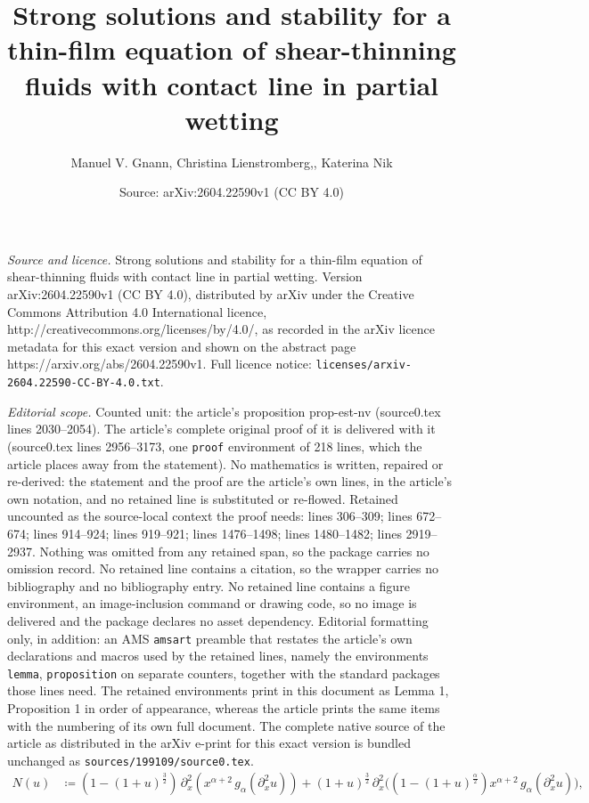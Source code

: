 \documentclass[10pt,a4paper]{amsart}
\title{Strong solutions and stability for a thin-film equation of shear-thinning fluids with contact line in partial wetting}
\author{Manuel V. Gnann, Christina Lienstromberg,, Katerina Nik}
\date{Source: arXiv:2604.22590v1 (CC BY 4.0)}
\begin{document}
\maketitle

\noindent\emph{Source and licence.} Strong solutions and stability for a thin-film equation of shear-thinning fluids with contact line in partial wetting. Version arXiv:2604.22590v1 (CC BY 4.0), distributed by arXiv under the Creative Commons Attribution 4.0 International licence, http://creativecommons.org/licenses/by/4.0/, as recorded in the arXiv licence metadata for this exact version and shown on the abstract page https://arxiv.org/abs/2604.22590v1. Full licence notice: \texttt{licenses/arxiv-2604.22590-CC-BY-4.0.txt}.\par\smallskip

\noindent\textit{Editorial scope.} Counted unit: the article's proposition prop-est-nv (source0.tex lines 2030--2054). The article's complete original proof of it is delivered with it (source0.tex lines 2956--3173, one \texttt{proof} environment of 218 lines, which the article places away from the statement). No mathematics is written, repaired or re-derived: the statement and the proof are the article's own lines, in the article's own notation, and no retained line is substituted or re-flowed.  Retained uncounted as the source-local context the proof needs: lines 306--309; lines 672--674; lines 914--924; lines 919--921; lines 1476--1498; lines 1480--1482; lines 2919--2937.  Nothing was omitted from any retained span, so the package carries no omission record.  No retained line contains a citation, so the wrapper carries no bibliography and no bibliography entry.  No retained line contains a figure environment, an image-inclusion command or drawing code, so no image is delivered and the package declares no asset dependency.  Editorial formatting only, in addition: an AMS \texttt{amsart} preamble that restates the article's own declarations and macros used by the retained lines, namely the environments \texttt{lemma}, \texttt{proposition} on separate counters, together with the standard packages those lines need.  The retained environments print in this document as Lemma 1, Proposition 1 in order of appearance, whereas the article prints the same items with the numbering of its own full document.  The complete native source of the article as distributed in the arXiv e-print for this exact version is bundled unchanged as \texttt{sources/199109/source0.tex}.
\begin{align}
N(u) &\coloneqq (1-  (1+u)^{\frac{3}{2}}) \,  \partial_x^2 (x^{\alpha+2} \, g_{\alpha}(\partial_x^2 u))
+ (1+u)^{\frac{3}{2}}\, \partial_x^2\big( (1- (1+u)^{\frac{\alpha}{2}}) x^{\alpha+2} \, g_{\alpha}(\partial_x^2 u) \big), \label{def-nu}
\end{align}
\end{document}
